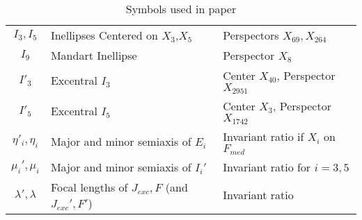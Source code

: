 \begin{table}
\begin{tabular}{|c|l|l|}
$I_3,I_5$ & Inellipses Centered on $X_3$,$X_5$ & Perspectors $X_{69},X_{264}$ \\
$I_9$ & Mandart Inellipse & Perspector $X_8$ \\
$I'_3$ & Excentral $I_3$ & Center $X_{40}$, Perspector $X_{2951}$ \cite{moses2020-private-circumconic} \\
$I'_5$ & Excentral $I_5$ & Center $X_{3}$, Perspector $X_{1742}$ \cite{moses2020-private-circumconic}\\
\hline
$\eta'_i,\eta_i$ & Major and minor semiaxis of $E_i$ & Invariant ratio if $X_i$ on $F_{med}$\\
$\mu_i',\mu_i$ & Major and minor semiaxis of $I_i'$ & Invariant ratio for $i=3,5$ \\
$\lambda',\lambda$ & Focal lengths of $J_{exc},F$ (and $J_{exc}',F'$) & Invariant ratio \\
\hline
\end{tabular}
\caption{Symbols used in paper}
\label{tab:symbols}
\end{table}